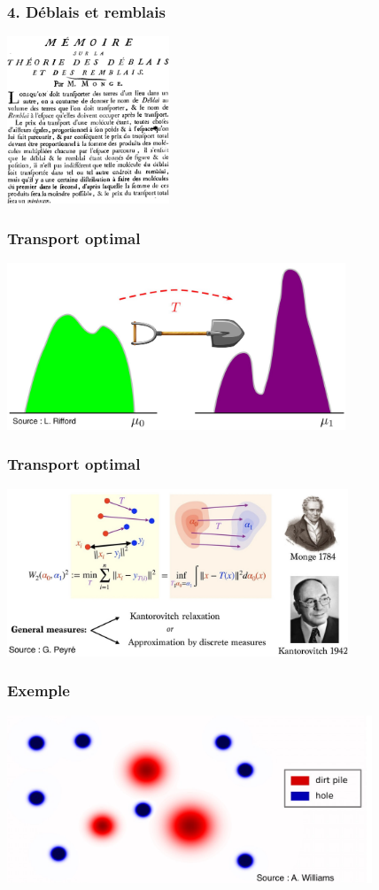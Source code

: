 \documentclass[9pt]{beamer}
\begin{document}
\begin{frame}
\frametitle{\bf 4. D\'eblais et remblais}
 
\centering \includegraphics[height=5.0cm]{deblais2}

\end{frame}

\begin{frame}
\frametitle{\bf Transport optimal}
 
\centering \includegraphics[height=5.0cm]{ot1}

\end{frame}

\begin{frame}
\frametitle{\bf Transport optimal}
 
\centering \includegraphics[height=5.0cm]{ot2}

\end{frame}

\begin{frame}
\frametitle{\bf Exemple}
 
\centering \includegraphics[height=5.0cm]{ex1}

\end{frame}
\end{document}
